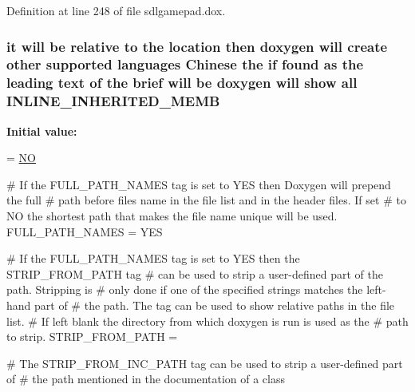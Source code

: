 Definition at line 248 of file sdlgamepad.\-dox.

\hypertarget{sdlgamepad_8dox_a917faf68b4323d3cbd972106282ca4e7}{
\subsubsection[{I\-N\-L\-I\-N\-E\-\_\-\-I\-N\-H\-E\-R\-I\-T\-E\-D\-\_\-\-M\-E\-M\-B}]{\setlength{\rightskip}{0pt plus 5cm}it will be relative to the {\bf location} then doxygen will create other supported languages {\bf Chinese} the {\bf if} found as the leading text of the brief will be doxygen will show all I\-N\-L\-I\-N\-E\-\_\-\-I\-N\-H\-E\-R\-I\-T\-E\-D\-\_\-\-M\-E\-M\-B}}\label{sdlgamepad_8dox_a917faf68b4323d3cbd972106282ca4e7}
{\bfseries Initial value\-:}
\begin{DoxyCode}
= \hyperlink{sdlgamepad_8dox_a0f6a46245280dc38baf9600906aa1393}{NO}

\textcolor{preprocessor}{# If the FULL\_PATH\_NAMES tag is set to YES then Doxygen will prepend the full}
\textcolor{preprocessor}{}\textcolor{preprocessor}{# path before files name in the file list and in the header files. If set}
\textcolor{preprocessor}{}\textcolor{preprocessor}{# to NO the shortest path that makes the file name unique will be used.}
\textcolor{preprocessor}{}
FULL\_PATH\_NAMES        = YES

\textcolor{preprocessor}{# If the FULL\_PATH\_NAMES tag is set to YES then the STRIP\_FROM\_PATH tag}
\textcolor{preprocessor}{}\textcolor{preprocessor}{# can be used to strip a user-defined part of the path. Stripping is}
\textcolor{preprocessor}{}\textcolor{preprocessor}{# only done if one of the specified strings matches the left-hand part of}
\textcolor{preprocessor}{}\textcolor{preprocessor}{# the path. The tag can be used to show relative paths in the file list.}
\textcolor{preprocessor}{}\textcolor{preprocessor}{# If left blank the directory from which doxygen is run is used as the}
\textcolor{preprocessor}{}\textcolor{preprocessor}{# path to strip.}
\textcolor{preprocessor}{}
STRIP\_FROM\_PATH        =

\textcolor{preprocessor}{# The STRIP\_FROM\_INC\_PATH tag can be used to strip a user-defined part of}
\textcolor{preprocessor}{# the path mentioned in the documentation of a class}
\end{DoxyCode}


